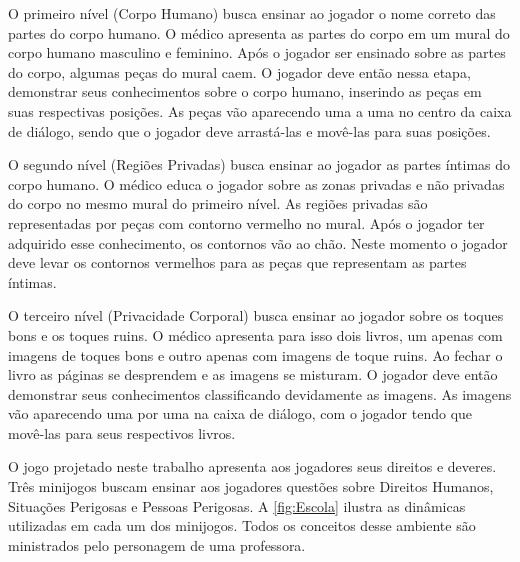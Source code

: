 \begin{figure}
  \vspace{-1.0cm}
\end{figure}

O primeiro nível (Corpo Humano) busca ensinar ao jogador o nome correto das partes do corpo humano. O médico apresenta as partes do corpo em um mural do corpo humano masculino e feminino. Após o jogador ser ensinado sobre as partes do corpo, algumas peças do mural caem. O jogador deve então nessa etapa, demonstrar seus conhecimentos sobre o corpo humano, inserindo as peças em suas respectivas posições. As peças vão aparecendo uma a uma no centro da caixa de diálogo, sendo que o jogador deve arrastá-las e movê-las para suas posições. %


O segundo nível (Regiões Privadas) busca ensinar ao jogador as partes íntimas do corpo humano. O médico educa o jogador sobre as zonas privadas e não privadas do corpo no mesmo mural do primeiro nível. As regiões privadas são representadas por peças com contorno vermelho no mural. Após o jogador ter adquirido esse conhecimento, os contornos vão ao chão. Neste momento o jogador deve levar os contornos vermelhos para as peças que representam as partes íntimas.

O terceiro nível (Privacidade Corporal) busca ensinar ao jogador sobre os toques bons e os toques ruins. O médico apresenta para isso dois livros, um apenas com imagens de toques bons e outro apenas com imagens de toque ruins. Ao fechar o livro as páginas se desprendem e as imagens se misturam. O jogador deve então demonstrar seus conhecimentos classificando devidamente as imagens. As imagens vão aparecendo uma por uma na caixa de diálogo, com o jogador tendo que movê-las para seus respectivos livros. 

O jogo projetado neste trabalho apresenta aos jogadores seus direitos e deveres. Três minijogos buscam ensinar aos jogadores questões sobre Direitos Humanos, Situações Perigosas e Pessoas Perigosas. A \autoref{fig:Escola} ilustra as dinâmicas utilizadas em cada um dos minijogos. Todos os conceitos desse ambiente são ministrados pelo personagem de uma professora. 

